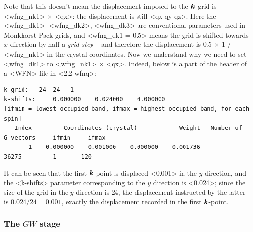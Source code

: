 \documentclass[hyperref, a4paper, 12pt]{report}
\def\texttt#1{<#1>}%
\newcommand{\shortcode}[1]{\texttt{#1}}
\begin{document}
\begin{enumerate}
\begin{enumerate}
\begin{itemize}
            Note that this doesn't mean the displacement imposed to the $\vb*{k}$-grid 
            is \shortcode{wfng_nk1} $\times$ \shortcode{qx}:
            the displacement is still \shortcode{qx qy qz}.
            Here the \shortcode{wfng_dk1}, \shortcode{wfng_dk2}, \shortcode{wfng_dk3} 
            are conventional parameters used in Monkhorst-Pack grids,
            and \shortcode{wfng_dk1 = 0.5} means 
            the grid is shifted towards $x$ direction by half a \emph{grid step}
            -- and therefore the displacement is 0.5 $\times$ 1 /  \shortcode{wfng_nk1}
            in the crystal coordinates.
            Now we understand why we need to set 
            \shortcode{wfng_dk1} to \shortcode{wfng_nk1} $\times$ \shortcode{qx}.
            Indeed, below is a part of the header of a \shortcode{WFN} file in \shortcode{2.2-wfnq}:
            \begin{lstlisting}
k-grid:   24  24   1
k-shifts:     0.000000    0.024000    0.000000
[ifmin = lowest occupied band, ifmax = highest occupied band, for each spin]
   Index         Coordinates (crystal)            Weight   Number of G-vectors     ifmin     ifmax
       1    0.000000    0.001000    0.000000    0.001736                 36275         1       120                
            \end{lstlisting}
            It can be seen that the first $\vb*{k}$-point is displaced \shortcode{0.001}
            in the $y$ direction,
            and the \shortcode{k-shifts} parameter corresponding to the $y$ direction is \shortcode{0.024};
            since the size of the grid in the $y$ direction is 24,
            the displacement instructed by the latter is $0.024 / 24 = 0.001$,
            exactly the displacement recorded in the first $\vb*{k}$-point.
        \end{itemize}
    \end{enumerate} 
\end{enumerate}

\subsubsection{The $GW$ stage}\label{sec:sop.gw}
\end{document}

